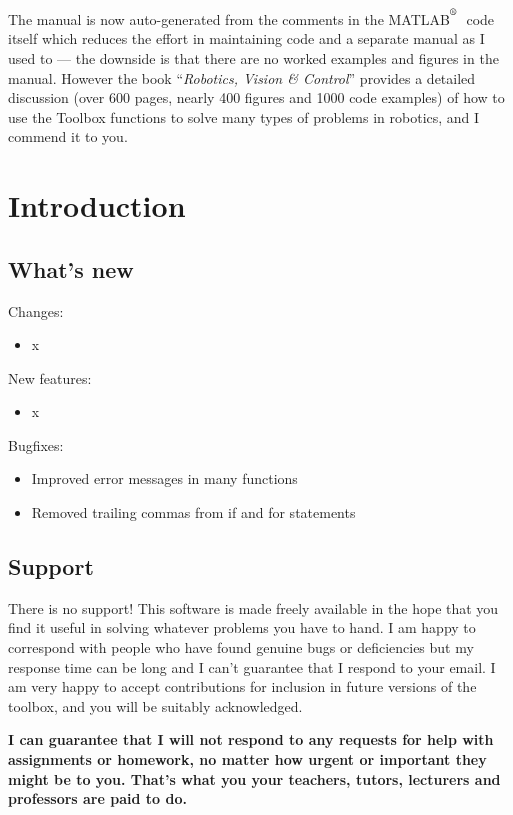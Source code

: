 \documentclass[a4paper]{report}
\def\Mlab{MATLAB$^{\textsuperscript{\textregistered}}$}
\begin{document}
The manual is now auto-generated from the comments in the \Mlab\ code itself which reduces the effort
in maintaining code and a separate manual as I used to --- the downside is that there are no worked examples and figures in the manual.
However the book ``\textit{Robotics, Vision \& Control}''  provides a detailed discussion (over 600 pages, nearly 400 figures and 1000 code examples)
of how to use the Toolbox functions to
solve many types of problems in robotics, and I commend it to you.


\newpage
\tableofcontents
\newpage
\chapter{Introduction}
\section{What's new}

Changes:
\begin{itemize}
\item x

\end{itemize}

New features:
\begin{itemize}
\item x
\end{itemize}

Bugfixes:
\begin{itemize}
\item Improved error messages in many functions
\item Removed trailing commas from if and for statements
\end{itemize}


\section{Support}
There is no support!  This software is made freely available in the hope that you find it useful in solving whatever problems
you have to hand.
I am happy to correspond with people who have found genuine
bugs or deficiencies but my response time can be long and I can't guarantee that I respond to your email.
I am very happy to accept contributions for inclusion in future versions of the
toolbox, and you will be suitably acknowledged.

\textbf{I can guarantee that I will not respond to any requests for help with assignments or homework, no matter
how urgent or important they might be to you.  That's what you your teachers, tutors, lecturers and professors are paid to do.}
\end{document}
